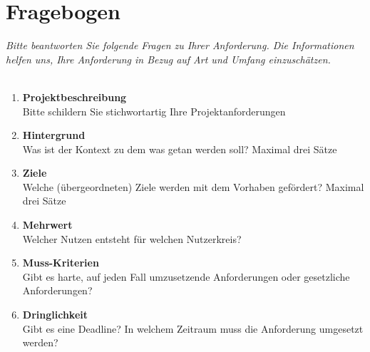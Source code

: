 \section{Fragebogen}
\textit{Bitte beantworten Sie folgende Fragen zu Ihrer Anforderung. Die Informationen helfen uns, Ihre Anforderung in Bezug auf Art und Umfang einzuschätzen. \\ \\
}

\begin{Form}
  \begin{enumerate}
  	
  	\item \textbf{Projektbeschreibung} \\
  	Bitte schildern Sie stichwortartig Ihre Projektanforderungen  \\
  	\TextField[multiline, name=description,width=0.9\textwidth,  height=2cm, value={}]{}
  	
  	\item \textbf{Hintergrund} \\
  	Was ist der Kontext zu dem was getan werden soll? Maximal drei Sätze \\
  	\TextField[multiline, name=background,width=0.9\textwidth,  height=2cm, value={} ]{}
  	
  	\item \textbf{Ziele} \\
  	Welche (übergeordneten) Ziele werden mit dem Vorhaben gefördert? Maximal drei Sätze  \\
  	\TextField[multiline, name=goal,width=0.9\textwidth,  height=2cm, value={}]{}
  	
  	\item \textbf{Mehrwert} \\
  	Welcher Nutzen entsteht für welchen Nutzerkreis? \\
  	\TextField[multiline, name=value,width=0.9\textwidth,  height=2cm, value={} ]{}
  	
  	\item \textbf{Muss-Kriterien} \\
  	Gibt es harte, auf jeden Fall umzusetzende Anforderungen oder gesetzliche Anforderungen?   \\
  	\TextField[multiline, name=must,width=0.9\textwidth,  height=2cm, value={}]{}

  	\newpage

  	\item \textbf{Dringlichkeit } \\
  Gibt es eine Deadline? In welchem Zeitraum muss die Anforderung umgesetzt werden? \\
  	\TextField[multiline, name=priority,width=0.9\textwidth,  height=2cm, value={} ]{}


\end{enumerate}
\end{Form}
